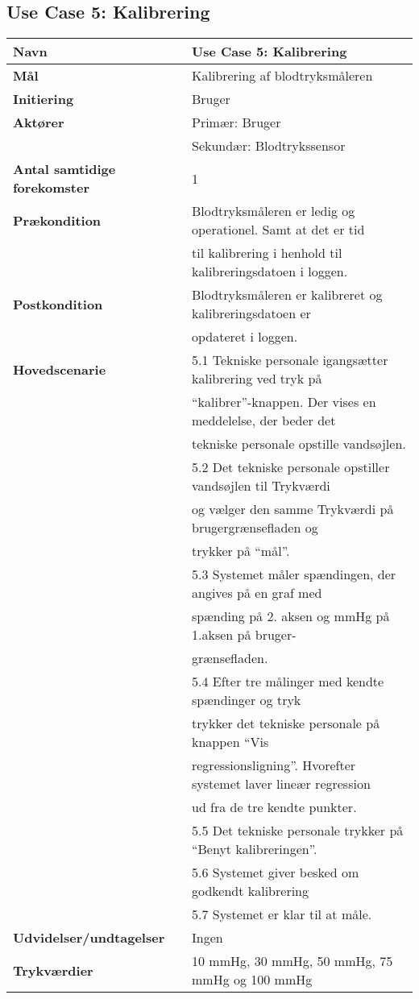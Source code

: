 \subsection{Use Case 5: Kalibrering}
\vspace{0.8 cm}
\begin{table}[h!]
	\begin{tabular}{l|l}
		\rowcolor[HTML]{A9D9F9} 
		\textbf{Navn} & Use Case 5: Kalibrering \\
		\hline
		\textbf{Mål} & Kalibrering af blodtryksmåleren \\
		\hline
		\rowcolor[HTML]{A9D9F9} 
		\textbf{Initiering} & Bruger \\
		\hline
		\textbf{Aktører} & Primær: Bruger \\
		\textbf{} & Sekundær: Blodtrykssensor \\
		\hline
		\rowcolor[HTML]{A9D9F9} 
		\textbf{Antal samtidige forekomster} & 1 \\
		\hline
		\textbf{Prækondition} & Blodtryksmåleren er ledig og operationel. Samt at det er tid \\
		\textbf{} & til kalibrering i henhold til kalibreringsdatoen i loggen. \\
		\hline
		\rowcolor[HTML]{A9D9F9} 
		\textbf{Postkondition} & Blodtryksmåleren er kalibreret og kalibreringsdatoen er \\
		\rowcolor[HTML]{A9D9F9} 
		\textbf{} & opdateret i loggen. \\
		\hline
		\textbf{Hovedscenarie} & 5.1 Tekniske personale igangsætter kalibrering ved tryk på \\
		& “kalibrer”-knappen. Der vises en meddelelse, der beder det \\
		& tekniske personale opstille vandsøjlen. \\
		& 5.2 Det tekniske personale opstiller vandsøjlen til Trykværdi \\
		& og vælger den samme Trykværdi på brugergrænsefladen og \\
		& trykker på “mål”. \\
		& 5.3 Systemet måler spændingen, der angives på en graf med \\
		& spænding på 2. aksen og mmHg på 1.aksen på bruger- \\
		& grænsefladen. \\
		& 5.4 Efter tre målinger med kendte spændinger og tryk \\
		& trykker det tekniske personale på knappen “Vis \\
		& regressionsligning”. Hvorefter systemet laver lineær regression  \\
		& ud fra de tre kendte punkter. \\
		& 5.5 Det tekniske personale trykker på “Benyt kalibreringen”. \\
		& 5.6 Systemet giver besked om godkendt kalibrering \\
		& 5.7 Systemet er klar til at måle. \\
		\hline
		\rowcolor[HTML]{A9D9F9} 
		\textbf{Udvidelser/undtagelser} & Ingen \\
		\hline
		\rowcolor[HTML]{A9D9F9} 
		\textbf{Trykværdier} & 10 mmHg, 30 mmHg, 50 mmHg, 75 mmHg og 100 mmHg
	\end{tabular}
\end{table}